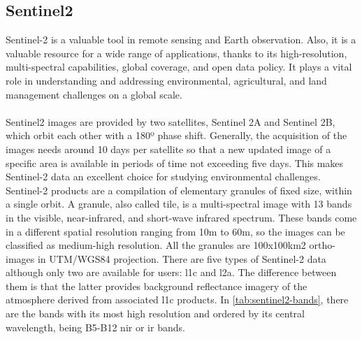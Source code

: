 \documentclass[../main.tex]{subfiles}
\begin{document}
	\subsection{Sentinel2}
Sentinel-2 is a valuable tool in remote sensing and Earth observation. Also, it is a valuable resource for a wide range of applications, thanks to its high-resolution, multi-spectral capabilities, global coverage, and open data policy. It plays a vital role in understanding and addressing environmental, agricultural, and land management challenges on a global scale.
\\
\\
Sentinel2 images are provided by two satellites, Sentinel 2A and Sentinel 2B, which orbit each other with a 180º phase shift. Generally, the acquisition of the images needs around 10 days per satellite so that a new updated image of a specific area is available in periods of time not exceeding five days. This makes Sentinel-2 data an excellent choice for studying environmental challenges. Sentinel-2 products are a compilation of elementary granules of fixed size, within a single orbit. A granule, also called tile, is a multi-spectral image with 13 bands in the visible, near-infrared, and short-wave infrared spectrum. These bands come in a different spatial resolution ranging from 10m to 60m, so the images can be classified as medium-high resolution. All the granules are 100x100km2 ortho-images in UTM/WGS84 projection. There are five types of Sentinel-2 data although only two are available for users: \gls{l1c} and \gls{l2a}. The difference between them is that the latter provides background reflectance imagery of the atmosphere derived from associated \gls{l1c} products. In \ref{tab:sentinel2-bands}, there are the bands with its most high resolution and ordered by its central wavelength, being B5-B12 \gls{nir} or \gls{ir} bands.
\end{document}
